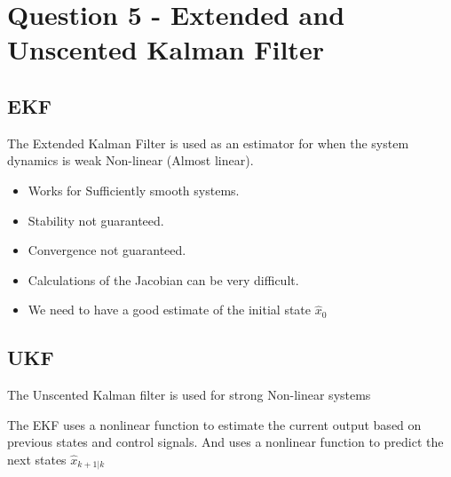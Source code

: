 \chapter{Question 5 - Extended and Unscented Kalman Filter}

\section*{EKF}
The Extended Kalman Filter is used as an estimator for when the system dynamics is weak Non-linear (Almost linear).
\begin{itemize}
        \item Works for Sufficiently smooth systems.
        \item Stability not guaranteed.
        \item Convergence not guaranteed.
        \item Calculations of the Jacobian can be very difficult.
        \item We need to have a good estimate of the initial state $\hat{x}_0$
\end{itemize}


\section*{UKF}
The Unscented Kalman filter is used for strong Non-linear systems

The EKF uses a nonlinear function to estimate the current output based on previous states and control signals. And uses a nonlinear function to predict the next states $\hat{x}_{k+1 \vert k}$
